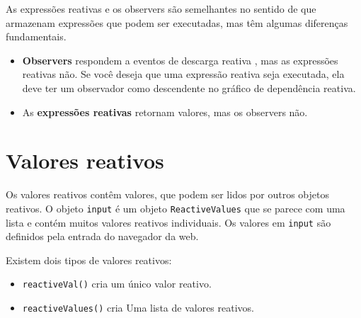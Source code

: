\documentclass[
]{book}
\newenvironment{Shaded}{\begin{snugshade}}{\end{snugshade}}
\newcommand{\AttributeTok}[1]{\textcolor[rgb]{0.77,0.63,0.00}{#1}}
\newcommand{\CommentTok}[1]{\textcolor[rgb]{0.56,0.35,0.01}{\textit{#1}}}
\newcommand{\DecValTok}[1]{\textcolor[rgb]{0.00,0.00,0.81}{#1}}
\newcommand{\FunctionTok}[1]{\textcolor[rgb]{0.00,0.00,0.00}{#1}}
\newcommand{\NormalTok}[1]{#1}
\newcommand{\OtherTok}[1]{\textcolor[rgb]{0.56,0.35,0.01}{#1}}
\newcommand{\SpecialCharTok}[1]{\textcolor[rgb]{0.00,0.00,0.00}{#1}}
\begin{document}
As expressões reativas e os observers são semelhantes no sentido de que armazenam expressões que podem ser executadas, mas têm algumas diferenças fundamentais.

\begin{itemize}
\item
  \textbf{Observers} respondem a eventos de descarga reativa , mas as expressões reativas não. Se você deseja que uma expressão reativa seja executada, ela deve ter um observador como descendente no gráfico de dependência reativa.
\item
  As \textbf{expressões reativas} retornam valores, mas os observers não.
\end{itemize}

\hypertarget{valores-reativos}{%
\section{\texorpdfstring{\textbf{Valores reativos}}{Valores reativos}}\label{valores-reativos}}

Os valores reativos contêm valores, que podem ser lidos por outros objetos reativos. O objeto \texttt{input} é um objeto \texttt{ReactiveValues} que se parece com uma lista e contém muitos valores reativos individuais. Os valores em \texttt{input} são definidos pela entrada do navegador da web.

Existem dois tipos de valores reativos:

\begin{itemize}
\item
  \texttt{reactiveVal()} cria um único valor reativo.
\item
  \texttt{reactiveValues()} cria Uma lista de valores reativos.
\end{itemize}

\begin{Shaded}
\end{Shaded}
\end{document}
